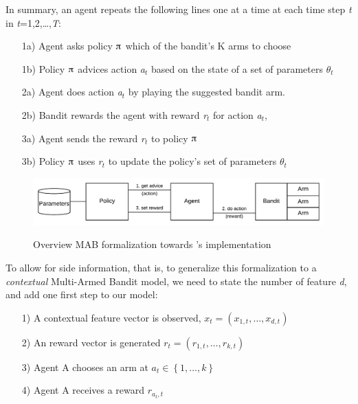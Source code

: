 \documentclass[nojss]{jss}\usepackage[]{graphicx}\usepackage[]{color}
\begin{document}
In summary, an agent repeats the following lines one at a time at each time step \textit{t }in \textit{t}=1,2,{\dots},\textit{T}:

\begin{enumerate}
         \item[1a)] Agent asks policy $\piup$ which of the bandit's K arms to choose
         \item[1b)] Policy $\piup$ advices action \textit{a${}_{t}$} based on the state of a set of parameters \textit{$\theta$${}_{t}$}
         \item[2a)] Agent does action \textit{a${}_{t}$} by playing the suggested bandit arm.
         \item[2b)] Bandit rewards the agent with reward \textit{r${}_{t}$ }for action \textit{a${}_{t}$},
         \item[3a)] Agent sends the reward\textit{ r${}_{t}$ }to policy $\piup$
         \item[3b)] Policy $\piup$ uses \textit{r${}_{t}$} to update the policy's set of parameters\textit{ $\theta$${}_{t}$}
\end{enumerate}

\begin{figure}[H]
  \centering
    \includegraphics[width=.99\textwidth]{fig/mab_chart}
    \label{fig:mab_chart}
      \caption{Overview MAB formalization towards 's implementation}
\end{figure}

To allow for side information, that is, to generalize this formalization to a \textit{contextual} Multi-Armed Bandit model, we need to state the number of feature \emph{d}, and add one first step to our model:

\begin{enumerate}
         \item[1)] A contextual feature vector is observed, \(x_{t}=\left( x_{1,t},  \dots, x_{d,t}\right)\)
         \item[2)] An reward vector is generated \(r_{t}=\left( r_{1,t},  \dots, r_{k,t}\right)\)
         \item[3)] Agent A chooses an arm at \(a_{t} \in \left\{ 1, \dots, k \right\}\)
         \item[4)] Agent A receives a reward \(r_{a_{t},t}\)
\end{enumerate}
\end{document}
